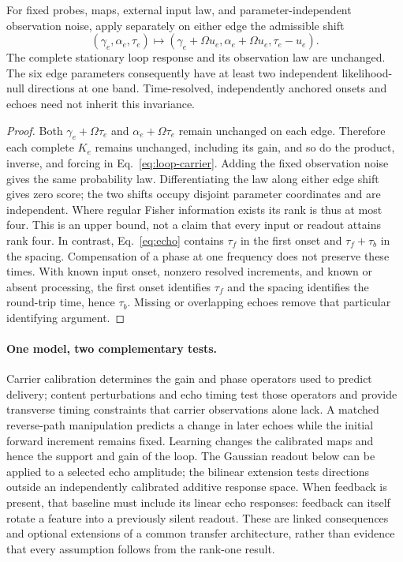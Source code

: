 \begin{proposition}\label{prop:loop-ridge}
For fixed probes, maps, external input law, and parameter-independent observation noise, apply separately on either edge the admissible shift
\[
(\gamma_e,\alpha_e,\tau_e)\mapsto
(\gamma_e+\Omega u_e,\alpha_e+\Omega u_e,\tau_e-u_e).
\]
The complete stationary loop response and its observation law are unchanged. The six edge parameters consequently have at least two independent likelihood-null directions at one band. Time-resolved, independently anchored onsets and echoes need not inherit this invariance.
\end{proposition}
\begin{proof}
Both $\gamma_e+\Omega\tau_e$ and $\alpha_e+\Omega\tau_e$ remain unchanged on each edge. Therefore each complete $K_e$ remains unchanged, including its gain, and so do the product, inverse, and forcing in Eq.~\eqref{eq:loop-carrier}. Adding the fixed observation noise gives the same probability law. Differentiating the law along either edge shift gives zero score; the two shifts occupy disjoint parameter coordinates and are independent. Where regular Fisher information exists its rank is thus at most four. This is an upper bound, not a claim that every input or readout attains rank four. In contrast, Eq.~\eqref{eq:echo} contains $\tau_f$ in the first onset and $\tau_f+\tau_b$ in the spacing. Compensation of a phase at one frequency does not preserve these times. With known input onset, nonzero resolved increments, and known or absent processing, the first onset identifies $\tau_f$ and the spacing identifies the round-trip time, hence $\tau_b$. Missing or overlapping echoes remove that particular identifying argument.
\end{proof}

\paragraph{One model, two complementary tests.} Carrier calibration determines the gain and phase operators used to predict delivery; content perturbations and echo timing test those operators and provide transverse timing constraints that carrier observations alone lack. A matched reverse-path manipulation predicts a change in later echoes while the initial forward increment remains fixed. Learning changes the calibrated maps and hence the support and gain of the loop. The Gaussian readout below can be applied to a selected echo amplitude; the bilinear extension tests directions outside an independently calibrated additive response space. When feedback is present, that baseline must include its linear echo responses: feedback can itself rotate a feature into a previously silent readout. These are linked consequences and optional extensions of a common transfer architecture, rather than evidence that every assumption follows from the rank-one result.

